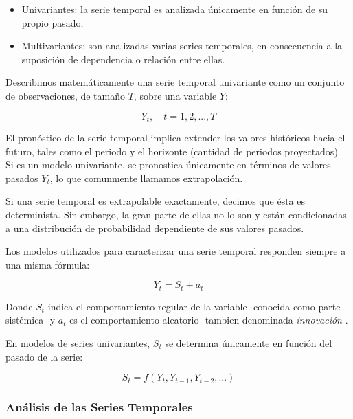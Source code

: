 \documentclass[a4paper,10pt]{article}
\begin{document}
\begin{itemize}
 \item Univariantes: la serie temporal es analizada únicamente en función de su propio pasado;

 \item Multivariantes: son analizadas varias series temporales, en consecuencia a la suposición de dependencia o relación entre ellas.
\end{itemize}

Describimos matemáticamente una serie temporal univariante como un conjunto de observaciones, de tamaño $T$, sobre una variable $Y$:

\begin{equation}
 Y_t, \quad t = 1,2,...,T
\end{equation}



El pronóstico de la serie temporal implica extender los valores históricos hacia el futuro, tales como el periodo y el horizonte (cantidad de periodos proyectados). Si es un modelo univariante, se pronostica únicamente en términos de valores pasados $Y_t$, lo que comunmente llamamos extrapolación.

Si una serie temporal es extrapolable exactamente, decimos que ésta es determinista. Sin embargo, la gran parte de ellas no lo son y están condicionadas a una distribución de probabilidad dependiente de sus valores pasados.

Los modelos utilizados para caracterizar una serie temporal responden siempre a una misma fórmula:

\begin{equation}\label{eqn:sistinnov}
 Y_t = S_t + a_t
\end{equation}

Donde $S_t$ indica el comportamiento regular de la variable -conocida como parte sistémica- y $a_t$ es el comportamiento aleatorio -tambien denominada \textit{innovación}-.

En modelos de series univariantes, $S_t$ se determina únicamente en función del pasado de la serie:

\begin{equation}
 S_t = f(Y_t, Y_{t-1}, Y_{t-2},...)
\end{equation}



\subsubsection{Análisis de las Series Temporales}
\end{document}

